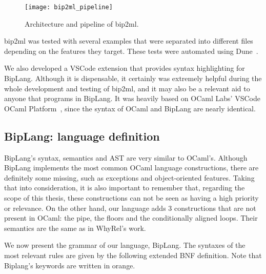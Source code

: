 \begin{figure}[htbp]
  \centering
  \texttt{[image: bip2ml\_pipeline]}
  \caption{Architecture and pipeline of bip2ml.}
  \label{fig:bip2ml_pipeline}
\end{figure}

bip2ml was tested with several examples that were separated into different files depending on the features they target.
These tests were automated using Dune~\cite{dune}.

We also developed a VSCode extension that provides syntax highlighting for BipLang.
Although it is dispensable, it certainly was extremely helpful during the whole development and testing of bip2ml, and it may also be a relevant aid to anyone that programs in BipLang.
It was heavily based on OCaml Labs' VSCode OCaml Platform~\cite{ocaml-platform}, since the syntax of OCaml and BipLang are nearly identical.


\FloatBarrier
\subsection{BipLang: language definition}
\label{subsec:lang_def}

BipLang's syntax, semantics and AST are very similar to OCaml's.
Although BipLang implements the most common OCaml language constructions, there are definitely some missing, such as exceptions and object-oriented features.
Taking that into consideration, it is also important to remember that, regarding the scope of this thesis, these constructions can not be seen as having a high priority or relevance.
On the other hand, our language adds 3 constructions that are not present in OCaml: the pipe, the floors and the conditionally aligned loops.
Their semantics are the same as in WhyRel's work.

We now present the grammar of our language, BipLang.
The syntaxes of the most relevant rules are given by the following extended BNF definition.
Note that Biplang's keywords are written in orange.

